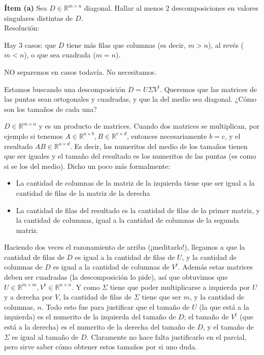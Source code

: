 \documentclass[10pt,a4paper,final]{article}
\begin{document}
\newcommand\Marco[2]{arg1: #1 and arg2: #2}

\newcommand\R[2]{\mathbb{R}^{#1\times #2}}


\textbf{Ítem (a)} Sea $D\in\mathbb{R}^{m\times n}$ diagonal. Hallar al menos 2 descomposiciones en valores singulares distintas de $D$.\\

Resolución:

Hay 3 casos: que $D$ tiene más filas que columnas (es decir, $m>n$), al revés ($m<n$), o que sea cuadrada ($m=n$).

NO separemos en casos todavía. No necesitamos.

Estamos buscando una descomposición $D = U\Sigma V^t$. Queremos que las matrices de las puntas sean ortogonales y cuadradas, y que la del medio sea diagonal. ¿Cómo son los tamaños de cada una?

$D \in \R{m}{n}$ y es un producto de matrices. Cuando dos matrices se multiplican, por ejemplo si tenemos $A\in\R{a}{b}, B\in\R{c}{d}$, entonces necesariamente $b=c$, y el resultado $AB \in\R{a}{d}$. Es decir, los numeritos del medio de los tamaños tienen que ser iguales y el tamaño del resultado es los numeritos de las puntas (es como si se  los del medio). Dicho un poco más formalmente:

\begin{itemize}
    \item La cantidad de columnas de la matriz de la izquierda tiene que ser igual a la cantidad de filas de la matriz de la derecha
    \item La cantidad de filas del resultado es la cantidad de filas de la primer matriz, y la cantidad de columnas, igual a la cantidad de columnas de la segunda matriz.
\end{itemize}

Haciendo dos veces el razonamiento de arriba (¡meditarlo!), llegamos a que la cantidad de filas de $D$ es igual a la cantidad de filas de $U$, y la cantidad de columnas de $D$ es igual a la cantidad de columnas de $V^t$. Además estas matrices deben ser cuadradas (la descomposición lo pide), así que obtuvimos que $U\in\R{m}{m}, V^t\in\R{n}{n}$. Y como $\Sigma$ tiene que poder multiplicarse a izquierda por $U$ y a derecha por $V$, la cantidad de filas de $\Sigma$ tiene que ser $m$, y la cantidad de columnas, $n$.
Todo esto fue para justificar que el tamaño de $U$ (la que está a la izquierda) es el numerito de la izquierda del tamaño de $D$; el tamaño de $V^t$ (que está a la derecha) es el numerito de la derecha del tamaño de $D$, y el tamaño de $\Sigma$ es igual al tamaño de $D$. Claramente no hace falta justificarlo en el parcial, pero sirve saber cómo obtener estos tamaños por si uno duda. \bigskip
\end{document}
